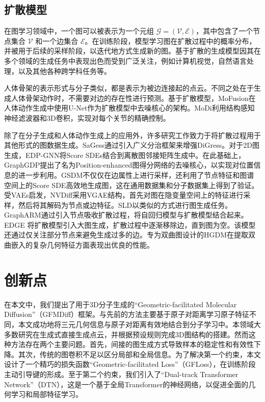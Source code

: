 \subsection{扩散模型}
在图学习领域中，一个图可以被表示为一个元组 $\mathcal{G} = (\mathcal{V}, \mathcal{E})$，其中包含了一个节点集合 $\mathcal{V}$ 和一个边集合 $\mathcal{E}$。在训练阶段，模型学习图在扩散过程中的概率分布，并被用于后续的采样阶段，以迭代地方式生成新的图。基于扩散的生成模型因其在多个领域的生成任务中表现出色而受到广泛关注，例如计算机视觉\cite{blendeddiffusion_avrahami_22,cascadeddiff_ho_22,gradforshapegen_cai_20,sgmpointcloud_luo_21}，自然语言处理\cite{struccddpm_austin_21,argmaxflow_hoogeboom_21,stepunrolled_savinov_22}，以及其他各种跨学科任务等\cite{cdvae_xie_22,housediffusion_shabani_23,nap_lei_23}。

人体骨架的表示形式与分子类似，都是表示为被边连接起的点云。不同之处在于生成人体骨架动作时，不需要对边的存在性进行预测。基于扩散模型，MoFusion\cite{mofusion_dabral_22}在人体动作生成中使用U-Net\cite{unet_ronneberger_15}作为扩散模型中去噪核心的架构。MoDi\cite{modi_raab_22}利用结构感知神经滤波器和3D卷积，实现对每个关节的精确控制。

除了在分子生成和人体动作生成上的应用外，许多研究工作致力于将扩散过程用于其他形式的图数据生成。SaGess\cite{sagess_limnios_23}通过引入广义分治框架来增强DiGress\cite{digress_vignac_22}。对于2D图生成，EDP-GNN\cite{edpgnn_niu_20}将Score SDEs结合到离散图邻接矩阵生成中。在此基础上，GraphGDP\cite{graphgdp_huang_22}提出了名为Position-enhanced图得分网络的去噪核心，以实现对位置信息的进一步利用。GSDM\cite{gsdm_luo_22}不仅仅在边属性上进行采样，还利用了节点特征和图谱空间上的Score SDE高效地生成图，这在通用数据集和分子数据集上得到了验证。受VAEs启发，NVDiff\cite{nvdiff_chen_22}采用VGAE结构，首先对图在隐变量空间上的特征进行采样，然后将其解码为节点或边特征。SLD\cite{sld_yang_23}以类似的方式进行图生成任务。GraphARM\cite{ardiff_kong_23}通过引入节点吸收扩散过程，将自回归模型与扩散模型结合起来。EDGE \cite{edge_chen_23}将扩散模型引入大图生成，扩散过程中逐渐移除边，直到图为空。该模型还通过仅关注部分节点来避免生成过多的边。专为双曲图设计的HGDM\cite{hgdm_wen_23}在提取双曲嵌入的复杂几何特征方面表现出优良的性能。



\section{创新点}
在本文中，我们提出了用于3D分子生成的“Geometric-facilitated Molecular Diffusion”（GFMDiff）框架。与先前的方法主要基于原子对距离学习原子特征不同，本文成功地将三元几何信息与原子对距离有效地结合到分子学习中。本领域大多数研究在生成式直接生成点云，并根据预设规则完成3D图结构的搭建。然而这种方法存在两个主要问题。首先，间接的图生成方式导致样本的稳定性和有效性下降。其次，传统的图卷积不足以区分局部和全局信息。为了解决第一个约束，本文设计了一个精巧的损失函数“Geometric-facilitated Loss”（GFLoss），在训练阶段主动引导键的形成。至于第二个约束，我们引入了“Dual-track Transformer Network”（DTN），这是一个基于全局Transformer的神经网络，以促进全面的几何学习和局部特征学习。


